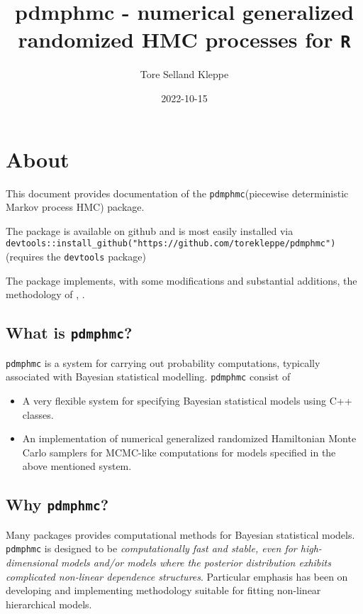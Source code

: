 \documentclass[
]{book}
\title{pdmphmc - numerical generalized randomized HMC processes for \texttt{R}}
\author{Tore Selland Kleppe}
\date{2022-10-15}
\begin{document}
\maketitle

{
\setcounter{tocdepth}{1}
\tableofcontents
}
\hypertarget{about}{%
\chapter{About}\label{about}}

This document provides documentation of the \texttt{pdmphmc}(piecewise deterministic Markov process HMC) package.

The package is available on github and is most easily installed via \texttt{devtools::install\_github("https://github.com/torekleppe/pdmphmc")} (requires the \texttt{devtools} package)

The package implements, with some modifications and substantial additions, the methodology of \citet{kleppe_CTHMC}, \citet{kleppe_amt}.

\hypertarget{what-is-pdmphmc}{%
\section{\texorpdfstring{What is \texttt{pdmphmc}?}{What is pdmphmc?}}\label{what-is-pdmphmc}}

\texttt{pdmphmc} is a system for carrying out probability computations, typically associated with Bayesian statistical modelling. \texttt{pdmphmc} consist of

\begin{itemize}
\item
  A very flexible system for specifying Bayesian statistical models using C++ classes.
\item
  An implementation of numerical generalized randomized Hamiltonian Monte Carlo samplers for MCMC-like computations for models specified in the above mentioned system.
\end{itemize}

\hypertarget{why-pdmphmc}{%
\section{\texorpdfstring{Why \texttt{pdmphmc}?}{Why pdmphmc?}}\label{why-pdmphmc}}

Many packages provides computational methods for Bayesian statistical models. \texttt{pdmphmc} is designed to be \emph{computationally fast and stable, even for high-dimensional models and/or models where the posterior distribution exhibits complicated non-linear dependence structures}. Particular emphasis has been on developing and implementing methodology suitable for fitting non-linear hierarchical models.
\end{document}
